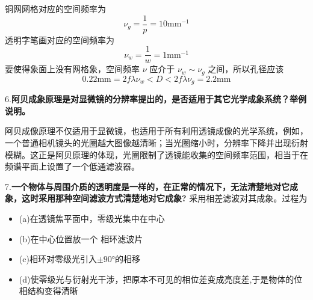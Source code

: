 \documentclass[12pt]{article}
\begin{document}
铜网网格对应的空间频率为
\begin{equation}
    \nu_g=\frac{1}{p}=10 \mathrm{mm^{-1}}
\end{equation}
透明字笔画对应的空间频率为
\begin{equation}
    \nu_w=\frac{1}{w}=1 \mathrm{mm^{-1}}
\end{equation}
要使得象面上没有网格象，空间频率 $\nu$ 应介于 $\nu_w \sim \nu_g$ 之间，所以孔径应该
\begin{equation}
    0.22 \mathrm{mm}=2f\lambda\nu_w<D<2f\lambda \nu_g=2.2\mathrm{mm}
\end{equation}

6.\textbf{阿贝成象原理是对显微镜的分辨率提出的，是否适用于其它光学成象系统？举例说明。}

阿贝成像原理不仅适用于显微镜，也适用于所有利用透镜成像的光学系统，例如，一个普通相机镜头的光圈越大图像越清晰；当光圈缩小时，分辨率下降并出现衍射模糊。这正是阿贝原理的体现，光圈限制了透镜能收集的空间频率范围，相当于在频谱平面上设置了一个低通滤波器。

7.\textbf{一个物体与周围介质的透明度是一样的，在正常的情况下，无法清楚地对它成象，这时采用那种空间滤波方式清楚地对它成象?}
采用相差滤波对其成象。过程为
\begin{itemize}
    \item (a)在透镜焦平面中，零级光集中在中心
    \item (b)在中心位置放一个 相环滤波片
    \item (c)相环对零级光引入$\pm90°$的相移
    \item (d)使零级光与衍射光干涉，把原本不可见的相位差变成亮度差,于是物体的位相结构变得清晰
\end{itemize}
\end{document}
